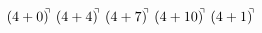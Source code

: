 \documentclass[preview]{standalone}
\begin{document}
\begin{align*}
(4+0)^{\hspace{-0.1cm}\urcorner} \ (4+4)^{\hspace{-0.1cm}\urcorner} \ (4+7)^{\hspace{-0.1cm}\urcorner} \ (4+10)^{\hspace{-0.1cm}\urcorner} \ (4+1)^{\hspace{-0.1cm}\urcorner}
\end{align*}
\end{document}

